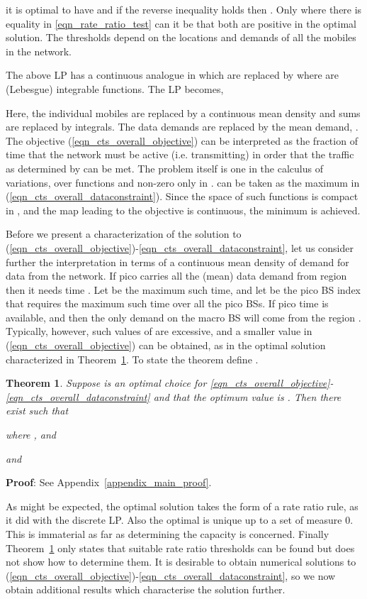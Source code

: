 \documentclass[12pt, draftcls, onecolumn]{IEEEtranTCOM}
\newtheorem{theorem}{Theorem}
\begin{document}
it is optimal to have  and if the reverse inequality holds then . Only where there is equality in \eqref{eqn_rate_ratio_test} can it be that both
 are positive in the optimal solution. The thresholds  depend on the locations and demands of all the mobiles in the network.


The above LP has a continuous analogue in which  are replaced by
 where  are (Lebesgue) integrable functions.
The LP becomes,

Here, the individual mobiles are replaced by a continuous mean density and sums are
replaced by integrals. The data demands are replaced by the mean demand, . The objective (\ref{eqn_cts_overall_objective}) can be interpreted as
the fraction of time that the network must be active (i.e. transmitting) in order that the traffic
as determined by  can be met. The problem itself is one in the calculus of variations,
over functions  and non-zero only in .  can be taken
as the maximum in (\ref{eqn_cts_overall_dataconstraint}). Since the space of such functions is
compact in , and the map leading to the objective is continuous, the minimum is achieved.

Before we present a characterization of the solution to (\ref{eqn_cts_overall_objective})-\eqref{eqn_cts_overall_dataconstraint}, let us consider further the interpretation in terms of
a continuous mean density of demand for data from the network. If pico  carries all the (mean) data demand from region  then it needs time . Let  be the maximum such time,
and let  be the pico BS index that requires the maximum such time over all the pico BSs. If pico time  is available, and  then the only demand on the macro BS
will come from the region . Typically, however, such values of  are excessive, and a smaller value in (\ref{eqn_cts_overall_objective}) can be
obtained, as in the optimal solution characterized in Theorem~\ref{thm_ctsLPsoln}.
To state the theorem define .

\begin{theorem}
\label{thm_ctsLPsoln}
Suppose  is an optimal choice for \eqref{eqn_cts_overall_objective}-\eqref{eqn_cts_overall_dataconstraint} and that the optimum value is .
Then there exist  such that
{\small

}
where , and
{\small

}
and

\end{theorem}

{\bf Proof}: See Appendix~\ref{appendix_main_proof}.

As might be expected, the optimal solution takes the form of a rate ratio rule, as it did with the discrete LP.
Also the optimal  is unique up to a set of measure 0.
This is immaterial as far as determining the capacity is concerned. Finally
Theorem~\ref{thm_ctsLPsoln} only states that suitable rate ratio thresholds can be found but does not
show how to determine them. It is desirable to obtain numerical solutions to (\ref{eqn_cts_overall_objective})-\eqref{eqn_cts_overall_dataconstraint}, so we now obtain additional results which characterise the solution further.
\end{document}
